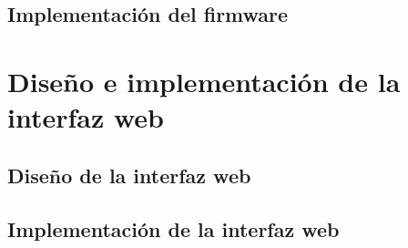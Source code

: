 \subsection{Implementación del firmware}





\section{Diseño e implementación de la interfaz web}

\subsection{Diseño de la interfaz web}


\subsection{Implementación de la interfaz web}





















